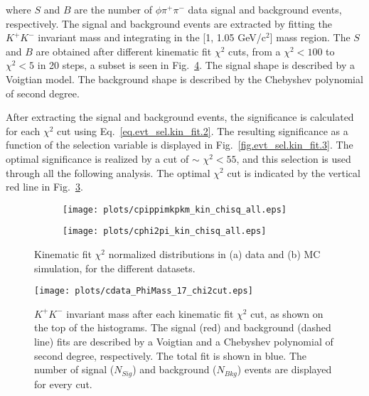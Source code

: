 \noindent where $S$ and $B$ are the number of $\phi \pi^{+}\pi^{-}$ data signal and background events, respectively. The signal and background events are extracted by fitting the $K^+K^-$ invariant mass and integrating in the [1, 1.05 GeV/c$^2$] mass region. The $S$ and $B$ are obtained after different kinematic fit $\chi^2$ cuts, from a $\chi^2<100$ to $\chi^2<5$ in 20 steps, a subset is seen in Fig.~\ref{fig.evt_sel.kin_fit.2}. The signal shape is described by a Voigtian model. The background shape is described by the Chebyshev polynomial of second degree.
~\par After extracting the signal and background events, the significance is calculated for each $\chi^{2}$ cut using Eq.~\ref{eq.evt_sel.kin_fit.2}. The resulting significance as a function of the selection variable is displayed in Fig.~\ref{fig.evt_sel.kin_fit.3}. The optimal significance is realized by a cut of $\sim$ $\chi^2<55$, and this selection is used through all the following analysis. The optimal $\chi^{2}$ cut is indicated by the vertical red line in Fig.~\ref{fig.evt_sel.kin_fit.1}.

\begin{figure}[H]
    \centering
    \begin{subfigure}[b]{0.5\textwidth}
        \texttt{[image: plots/cpippimkpkm\_kin\_chisq\_all.eps]}
        \caption{}
        \label{fig.evt_sel.kin_fit.1.a}
    \end{subfigure}\hfill
    \begin{subfigure}[b]{0.5\textwidth}
        \texttt{[image: plots/cphi2pi\_kin\_chisq\_all.eps]}
        \caption{}
        \label{fig.evt_sel.kin_fit.1.b}
    \end{subfigure}
    \caption{Kinematic fit $\chi^2$ normalized distributions in (a) data and (b) MC simulation, for the different datasets.}
    \label{fig.evt_sel.kin_fit.1}
\end{figure}

\begin{figure}[H]
    \centering
        \texttt{[image: plots/cdata\_PhiMass\_17\_chi2cut.eps]}
        \caption{$K^+K^-$ invariant mass after each kinematic fit $\chi^2$ cut, as shown on the top of the histograms. The signal (red) and background (dashed line) fits are described by a Voigtian and a Chebyshev polynomial of second degree, respectively. The total fit is shown in blue. The number of signal ($N_{Sig}$) and background ($N_{Bkg}$) events are displayed for every cut.}
        \label{fig.evt_sel.kin_fit.2}
\end{figure}

